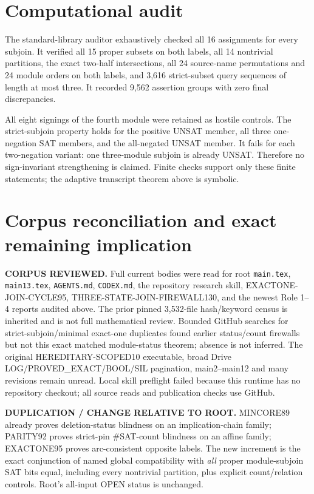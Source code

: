 \documentclass[11pt]{article}
\begin{document}
\section{Computational audit}
The standard-library auditor exhaustively checked all 16 assignments for
every subjoin.  It verified all 15 proper subsets on both labels, all 14
nontrivial partitions, the exact two-half intersections, all 24 source-name
permutations and 24 module orders on both labels, and 3,616 strict-subset
query sequences of length at most three.  It recorded 9,562 assertion groups
with zero final discrepancies.

All eight signings of the fourth module were retained as hostile controls.
The strict-subjoin property holds for the positive UNSAT member, all three
one-negation SAT members, and the all-negated UNSAT member.  It fails for
each two-negation variant: one three-module subjoin is already UNSAT.
Therefore no sign-invariant strengthening is claimed.  Finite checks support
only these finite statements; the adaptive transcript theorem above is
symbolic.

\section{Corpus reconciliation and exact remaining implication}
\textbf{CORPUS REVIEWED.}  Full current bodies were read for root
\texttt{main.tex}, \texttt{main13.tex}, \texttt{AGENTS.md},
\texttt{CODEX.md}, the repository research skill,
EXACTONE-JOIN-CYCLE95, THREE-STATE-JOIN-FIREWALL130, and the newest Role
1--4 reports audited above.  The prior pinned 3,532-file hash/keyword census
is inherited and is not full mathematical review.  Bounded GitHub searches
for strict-subjoin/minimal exact-one duplicates found earlier status/count
firewalls but not this exact matched module-status theorem; absence is not
inferred.  The original HEREDITARY-SCOPED10 executable, broad Drive
LOG/PROVED\_EXACT/BOOL/SIL pagination, main2--main12 and many revisions
remain unread.  Local skill preflight failed because this runtime has no
repository checkout; all source reads and publication checks use GitHub.

\textbf{DUPLICATION / CHANGE RELATIVE TO ROOT.}  MINCORE89 already proves
deletion-status blindness on an implication-chain family; PARITY92 proves
strict-pin \#SAT-count blindness on an affine family; EXACTONE95 proves
arc-consistent opposite labels.  The new increment is the exact conjunction
of named global compatibility with \emph{all} proper module-subjoin SAT bits
equal, including every nontrivial partition, plus explicit count/relation
controls.  Root's all-input OPEN status is unchanged.
\end{document}

